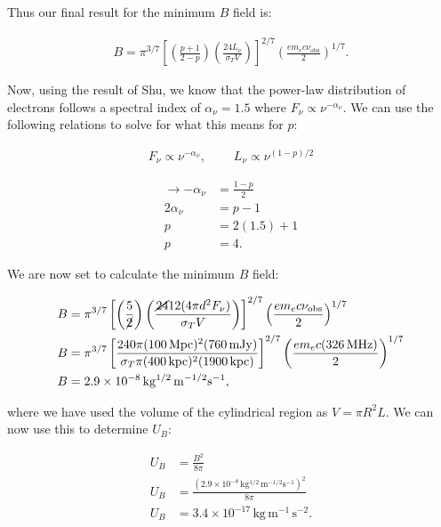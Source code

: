 \documentclass[12pt]{article}
\begin{document}
{\noindent}Thus our final result for the minimum $B$ field is:

\begin{align*}
    \boxed{B = \pi^{3/7} \left[\left(\frac{p+1}{2-p}\right) \left(\frac{24L_\nu}{\sigma_TV}\right)\right]^{2/7} \left(\frac{em_ec\nu_\mathrm{obs}}{2}\right)^{1/7}}.
\end{align*}

Now, using the result of Shu, we know that the power-law distribution of electrons follows a spectral index of $\alpha_\nu = 1.5$ where $F_\nu \propto \nu^{-\alpha_\nu}$. We can use the following relations to solve for what this means for $p$:

\begin{align*}
    F_\nu \propto \nu^{-\alpha_\nu},~~~~~~~~~~ L_\nu \propto \nu^{(1-p)/2}
\end{align*}

\begin{align*} \rightarrow -\alpha_\nu &= \frac{1-p}{2} \\
    2\alpha_\nu &= p-1 \\
    p &= 2(1.5) + 1 \\
    p &= 4.
\end{align*}

{\noindent}We are now set to calculate the minimum $B$ field:

\begin{align*}
    B &= \pi^{3/7} \left[\left(\frac{5}{\cancel{2}}\right) \left(\frac{\cancel{24}12(4\pi d^2 F_\nu)}{\sigma_TV}\right)\right]^{2/7} \left(\frac{em_ec\nu_\mathrm{obs}}{2}\right)^{1/7} \\
    B &= \pi^{3/7} \left[\frac{240\pi (100\,\mathrm{Mpc})^2 (760\,\mathrm{mJy})}{\sigma_T\pi(400\,\mathrm{kpc})^2(1900\,\mathrm{kpc})}\right]^{2/7} \left(\frac{em_ec(326\,\mathrm{MHz})}{2}\right)^{1/7}  \\
    B &= 2.9 \times 10^{-8}\,\mathrm{kg^{1/2}\,m^{-1/2}s^{-1}},
\end{align*}

{\noindent}where we have used the volume of the cylindrical region as $V = \pi R^2 L$. We can now use this to determine $U_B$:

\begin{align*}
    U_B &= \frac{B^2}{8\pi} \\
    U_B &= \frac{(2.9 \times 10^{-8}\,\mathrm{kg^{1/2}\,m^{-1/2}s^{-1}})^2}{8\pi} \\
    U_B &= 3.4 \times 10^{-17} \,\mathrm{kg\,m^{-1}\,s^{-2}}.
\end{align*}
\end{document}
